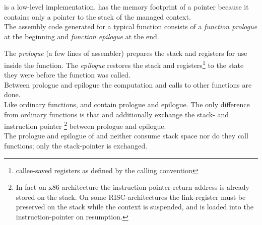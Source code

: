 
\cc is a low-level implementation. \cont has the memory footprint of a pointer
because it contains only a pointer to the stack of the managed context.\\
\newline
The assembly code generated for a typical function consists of
a \emph{function prologue} at the beginning and \emph{function epilogue} at
the end.

The \emph{prologue} (a few lines of assembler) prepares the stack and
registers for use inside the function. The \emph{epilogue} restores the stack
and registers\footnote{callee-saved registers as defined by the calling
convention} to the state they were before the function was called.\\
Between prologue and epilogue the computation and calls to other functions are
done.\\
\newline
Like ordinary functions, \resume and \resumewith contain prologue and
epilogue. The only difference from ordinary functions is that \resume and
\resumewith additionally exchange the stack- and instruction pointer
\footnote{In fact on x86-architecture the instruction-pointer return-address
is already stored on the stack. On some RISC-architectures the link-register
must be preserved on the stack while the context is suspended, and is loaded
into the instruction-pointer on resumption.} between prologue and epilogue.\\
The prologue and epilogue of \resume and \resumewith neither consume stack space
nor do they call functions; only the stack-pointer is exchanged.
